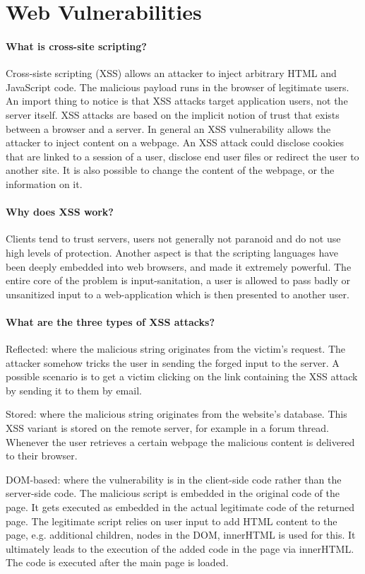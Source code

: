 \section{Web Vulnerabilities}
\paragraph{What is cross-site scripting?}
Cross-siste scripting (XSS) allows an attacker to inject arbitrary HTML and JavaScript code. The malicious payload runs in the browser of legitimate users. An import thing to notice is that XSS attacks target application users, not the server itself. XSS attacks are based on the implicit notion of trust that exists between a browser and a server. In general an XSS vulnerability allows the attacker to inject content on a webpage. An XSS attack could disclose cookies that are linked to a session of a user, disclose end user files or redirect the user to another site. It is also possible to change the content of the webpage, or the information on it.

\paragraph{Why does XSS work?}
Clients tend to trust servers, users not generally not paranoid and do not use high levels of protection. Another aspect is that the scripting languages have been deeply embedded into web browsers, and made it extremely powerful. The entire core of the problem is input-sanitation, a user is allowed to pass badly or unsanitized input to a web-application which is then presented to another user.

\paragraph{What are the three types of XSS attacks?}
Reflected: where the malicious string originates from the victim's request. The attacker somehow tricks the user in sending the forged input to the server. A possible scenario is to get a victim clicking on the link containing the XSS attack by sending it to them by email.

Stored: where the malicious string originates from the website's database. This XSS variant is stored on the remote server, for example in a forum thread. Whenever the user retrieves a certain webpage the malicious content is delivered to their browser.

DOM-based: where the vulnerability is in the client-side code rather than the server-side code. The malicious script is embedded in the original code of the page. It gets executed as embedded in the actual legitimate code of the returned page. The legitimate script relies on user input to add HTML content to the page, e.g. additional children, nodes in the DOM, innerHTML is used for this. It ultimately leads to the execution of the added code in the page via innerHTML. The code is executed after the main page is loaded.

